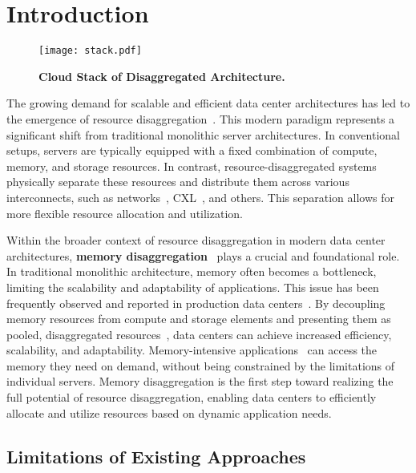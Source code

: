 \chapter{Introduction}
\label{chap:introduction}
\begin{figure}[t]
    \centering
    \texttt{[image: stack.pdf]}
      \caption[Cloud Stack of Disaggregated Architecture]{\textbf{Cloud Stack of Disaggregated Architecture.}} \vspace{-1.0em}
      \label{fig:stack}
\end{figure}
The growing demand for scalable and efficient data center architectures has led to the emergence of resource disaggregation~\cite{mind, legoos, disagg, memdisagg1, memdisagg2, memdisagg3, memdisagg4, memdisagg5, memdisagg6}. This modern paradigm represents a significant shift from traditional monolithic server architectures. In conventional setups, servers are typically equipped with a fixed combination of compute, memory, and storage resources. In contrast, resource-disaggregated systems physically separate these resources and distribute them across various interconnects, such as networks~\cite{disagg, legoos, mind}, CXL~\cite{cxl, cxlasic}, and others. This separation allows for more flexible resource allocation and utilization.

Within the broader context of resource disaggregation in modern data center architectures, \textbf{memory disaggregation}~\cite{memdisagg1, memdisagg2, memdisagg3, memdisagg4, memdisagg5, memdisagg6} plays a crucial and foundational role. In traditional monolithic architecture, memory often becomes a bottleneck, limiting the scalability and adaptability of applications. This issue has been frequently observed and reported in production data centers~\cite{memory1, memory2, memory3, memory4, memory5, memory6, memory7, memory8, memory9, memory10}. By decoupling memory resources from compute and storage elements and presenting them as pooled, disaggregated resources~\cite{pool1, pool2}, data centers can achieve increased efficiency, scalability, and adaptability. Memory-intensive applications~\cite{redis, ramcloud, sparkmemory} can access the memory they need on demand, without being constrained by the limitations of individual servers. Memory disaggregation is the first step toward realizing the full potential of resource disaggregation, enabling data centers to efficiently allocate and utilize resources based on dynamic application needs. 


\section{Limitations of Existing Approaches}

